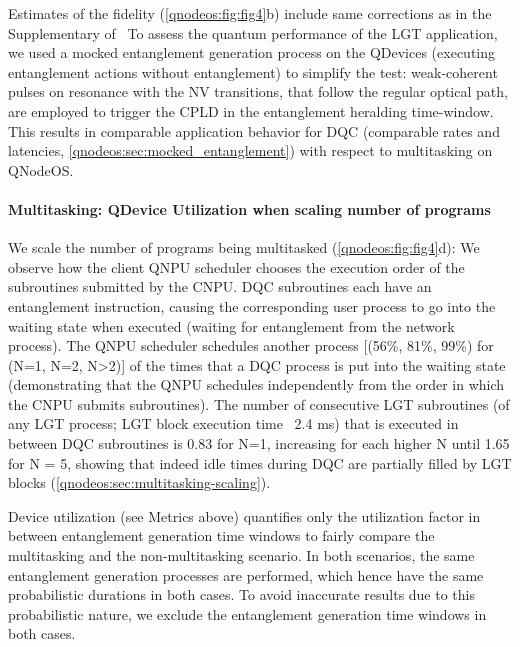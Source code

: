 Estimates of the fidelity (\cref{qnodeos:fig:fig4}b) include same corrections as in the Supplementary of~\cite{pompili_2021_multinode} To assess the quantum performance of the LGT application, we used a mocked entanglement generation process on the QDevices (executing entanglement actions without entanglement) to simplify the test: weak-coherent pulses on resonance with the NV transitions, that follow the regular optical path, are employed to trigger the CPLD in the entanglement heralding time-window. This results in comparable application behavior for DQC (comparable rates and latencies, \cref{qnodeos:sec:mocked_entanglement}) with respect to multitasking on QNodeOS.

\paragraph{Multitasking: QDevice Utilization when scaling number of programs}

We scale the number of programs being multitasked (\cref{qnodeos:fig:fig4}d): We observe how the client QNPU scheduler chooses the execution order of the subroutines submitted by the CNPU. DQC subroutines each have an entanglement instruction, causing the corresponding user process to go into the waiting state when executed (waiting for entanglement from the network process). The QNPU scheduler schedules another process [(56\%, 81\%, 99\%) for (N=1, N=2, N>2)] of the times that a DQC process is put into the waiting state (demonstrating that the QNPU schedules independently from the order in which the CNPU submits subroutines). The number of consecutive LGT subroutines (of any LGT process; LGT block execution time ~2.4 ms) that is executed in between DQC subroutines is 0.83 for N=1, increasing for each higher N until 1.65 for N = 5, showing that indeed idle times during DQC are partially filled by LGT blocks (\cref{qnodeos:sec:multitasking-scaling}).

Device utilization (see Metrics above) quantifies only the utilization factor in between entanglement generation time windows to fairly compare the multitasking and the non-multitasking scenario. In both scenarios, the same entanglement generation processes are performed, which hence have the same probabilistic durations in both cases. To avoid inaccurate results due to this probabilistic nature, we exclude the entanglement generation time windows in both cases.